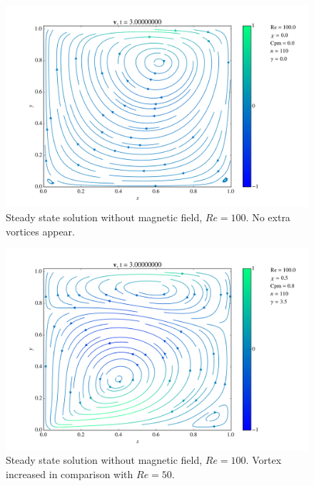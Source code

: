 \documentclass[journal]{IEEEtran}
\begin{document}
\begin{figure}[!t]
\centering
\includegraphics[width=\linewidth]{figures/Re100/n/vectorField}
\caption{Steady state solution without magnetic field, $\mathit{Re}=100$. No extra vortices appear. \label{Re100nVectorField}}
\end{figure}

\begin{figure}[!t]
\centering
\includegraphics[width=\linewidth]{figures/Re100/w/vectorField}
\caption{Steady state solution without magnetic field, $\mathit{Re}=100$. Vortex increased in comparison with $\mathit{Re} = 50$. \label{Re100wVectorField}}
\end{figure}
\end{document}
